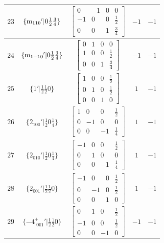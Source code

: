 \documentclass[fleqn,8pt]{jsarticle}
\begin{document}
\begin{longtable}{ccccc}
$ 23 $ & $ \{{\rm m}_{110}{}'|0 \frac{1}{2} \frac{3}{4}\} $ & $ \begin{bmatrix} 0 & -1 & 0 & 0 \\ -1 & 0 & 0 & \frac{1}{2} \\ 0 & 0 & 1 & \frac{3}{4} \end{bmatrix} $ & $ -1 $ & $ -1 $ \\ \hline
$ 24 $ & $ \{{\rm m}_{1-10}{}'|0 \frac{1}{2} \frac{3}{4}\} $ & $ \begin{bmatrix} 0 & 1 & 0 & 0 \\ 1 & 0 & 0 & \frac{1}{2} \\ 0 & 0 & 1 & \frac{3}{4} \end{bmatrix} $ & $ -1 $ & $ -1 $ \\ \hline
$ 25 $ & $ \{1{}'|\frac{1}{2} \frac{1}{2} 0\} $ & $ \begin{bmatrix} 1 & 0 & 0 & \frac{1}{2} \\ 0 & 1 & 0 & \frac{1}{2} \\ 0 & 0 & 1 & 0 \end{bmatrix} $ & $ 1 $ & $ -1 $ \\ \hline
$ 26 $ & $ \{2{}_{100}{}'|\frac{1}{2} 0 \frac{1}{4}\} $ & $ \begin{bmatrix} 1 & 0 & 0 & \frac{1}{2} \\ 0 & -1 & 0 & 0 \\ 0 & 0 & -1 & \frac{1}{4} \end{bmatrix} $ & $ 1 $ & $ -1 $ \\ \hline
$ 27 $ & $ \{2{}_{010}{}'|\frac{1}{2} 0 \frac{1}{4}\} $ & $ \begin{bmatrix} -1 & 0 & 0 & \frac{1}{2} \\ 0 & 1 & 0 & 0 \\ 0 & 0 & -1 & \frac{1}{4} \end{bmatrix} $ & $ 1 $ & $ -1 $ \\ \hline
$ 28 $ & $ \{2{}_{001}{}'|\frac{1}{2} \frac{1}{2} 0\} $ & $ \begin{bmatrix} -1 & 0 & 0 & \frac{1}{2} \\ 0 & -1 & 0 & \frac{1}{2} \\ 0 & 0 & 1 & 0 \end{bmatrix} $ & $ 1 $ & $ -1 $ \\ \hline
$ 29 $ & $ \{-4^{+}_{\,\,001}{}'|\frac{1}{2} \frac{1}{2} 0\} $ & $ \begin{bmatrix} 0 & 1 & 0 & \frac{1}{2} \\ -1 & 0 & 0 & \frac{1}{2} \\ 0 & 0 & -1 & 0 \end{bmatrix} $ & $ -1 $ & $ -1 $ \\ \hline

\end{longtable}
\end{document}
